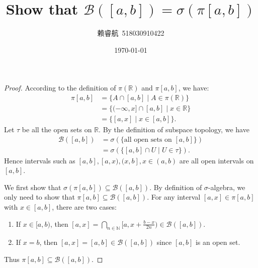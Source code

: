 \documentclass[a4paper, linespread=1.5]{article}
\newcommand{\Natural}{\mathbb{N}}
\newcommand{\Real}{\mathbb{R}}
\newcommand{\BorelSet}{\mathcal{B}}
\begin{document}
    \title{Show that $\BorelSet([a, b]) = \sigma(\pi[a, b])$}
    \author{赖睿航\ 518030910422}
    \date{\today}
    \maketitle
    
    \begin{proof}
        According to the definition of $\pi(\Real)$ and $\pi[a, b]$, we have:
        \begin{align*}
            \pi[a, b] &= \{A \cap [a, b] \mid A \in \pi(\Real)\} \\
            &= \{(-\infty, x] \cap [a, b] \mid x \in \Real \} \\
            &= \{[a, x] \mid x \in [a, b]\}.
        \end{align*}
        Let $\tau$ be all the open sets on $\Real$. By the definition of subspace topology, we have
        \begin{align*}
        \BorelSet([a, b]) &= \sigma(\{\textrm{all open sets on } [a, b]\}) \\
        &= \sigma(\{[a, b] \cap U \mid U \in \tau \}).
        \end{align*}
        Hence intervals such as $[a, b], [a, x), (x, b], x \in (a, b)$ are all open intervals on $[a, b]$.
        
        We first show that $\sigma(\pi[a, b]) \subseteq \BorelSet([a, b])$. By definition of $\sigma$-algebra, we only need to show that $\pi[a, b] \subseteq \BorelSet([a, b])$. For any interval $[a, x] \in \pi[a, b]$ with $x \in [a, b]$, there are two cases:
        \begin{enumerate}
            \item If $x \in [a, b)$, then $[a, x] = \bigcap_{n \in \Natural} [a, x + \frac{b - x}{2n}) \in \BorelSet([a, b])$.
            \item If $x = b$, then $[a, x] = [a, b] \in \BorelSet([a, b])$ since $[a, b]$ is an open set.
        \end{enumerate}
        Thus $\pi[a, b] \subseteq \BorelSet([a, b])$.
        

\end{proof}
\end{document}
